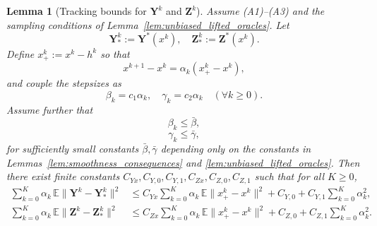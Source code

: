 \documentclass{pkumelon}
\theoremstyle{plain}
\newtheorem{lemma}{Lemma}
\newcommand{\E}{\mathbb{E}}
\begin{document}
\begin{lemma}[Tracking bounds for $\boldsymbol Y^k$ and $\boldsymbol Z^k$]\label{lem:yz_tracking_rso}
Assume \emph{(A1)}--\emph{(A3)} and the sampling conditions of Lemma~\ref{lem:unbiased_lifted_oracles}. Let
\begin{equation*}
\boldsymbol Y_*^k:=\boldsymbol Y^*(x^k), \quad \boldsymbol Z_*^k:=\boldsymbol Z^*(x^k).
\end{equation*}
Define $x_+^k:=x^k-h^k$ so that
\begin{equation}\label{eq:xplus_relation_YZ}
x^{k+1}-x^k=\alpha_k(x_+^k-x^k),
\end{equation}
and couple the stepsizes as
\begin{equation}\label{eq:beta_gamma_coupling_YZ}
\beta_k=c_1\alpha_k,\quad \gamma_k=c_2\alpha_k\quad (\forall k\ge 0).
\end{equation}
Assume further that
\begin{equation}\label{eq:beta_cond_YZ}
\beta_k\le \bar\beta,
\end{equation}
\begin{equation}\label{eq:gamma_cond_YZ}
\gamma_k\le \bar\gamma,
\end{equation}
for sufficiently small constants $\bar\beta,\bar\gamma$ depending only on the constants in Lemmas~\ref{lem:smoothness_consequences} and \ref{lem:unbiased_lifted_oracles}. Then there exist finite constants $C_{Yx},C_{Y,0},C_{Y,1},C_{Zx},C_{Z,0},C_{Z,1}$ such that for all $K\ge 0$,
\begin{align}
\sum_{k=0}^{K}\alpha_k\,\E\|\boldsymbol Y^k-\boldsymbol Y_*^k\|^2
&\le C_{Yx}\sum_{k=0}^{K}\alpha_k\,\E\|x_+^k-x^k\|^2 + C_{Y,0}+C_{Y,1}\sum_{k=0}^{K}\alpha_k^2,\label{eq:Y_track_sum}\\
\sum_{k=0}^{K}\alpha_k\,\E\|\boldsymbol Z^k-\boldsymbol Z_*^k\|^2
&\le C_{Zx}\sum_{k=0}^{K}\alpha_k\,\E\|x_+^k-x^k\|^2 + C_{Z,0}+C_{Z,1}\sum_{k=0}^{K}\alpha_k^2.\label{eq:Z_track_sum}
\end{align}
\end{lemma}
\end{document}
